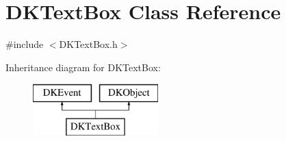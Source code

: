 \hypertarget{class_d_k_text_box}{\section{D\-K\-Text\-Box Class Reference}
\label{class_d_k_text_box}
}


{\ttfamily \#include $<$D\-K\-Text\-Box.\-h$>$}

Inheritance diagram for D\-K\-Text\-Box\-:\begin{figure}[H]
\begin{center}
\leavevmode
\includegraphics[height=2.000000cm]{class_d_k_text_box}
\end{center}
\end{figure}
